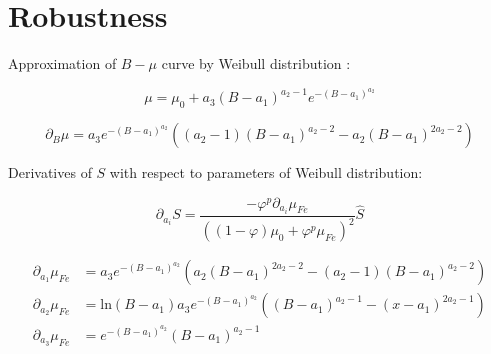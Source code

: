 \newpage
\chapter{Robustness}

\noindent Approximation of $B-\mu$ curve by Weibull distribution :

\begin{equation} \label{eq:70} 
\mu = \mu_0 + a_3 \left( B - a_1 \right)^{a_2 - 1} e^{-\left( B - a_1 \right)^{a_2}}
\end{equation}

\begin{equation} \label{eq:71} 
\partial_B \mu = a_3 e^{-\left( B - a_1 \right)^{a_2}} \left(\left(a_2 -1\right) \left( B - a_1 \right)^{a_2 - 2} - a_2 \left( B - a_1 \right)^{2a_2 - 2} \right) 
\end{equation}

\noindent Derivatives of $S$ with respect to parameters of Weibull distribution:

\begin{equation} \label{eq:72}
\partial_{a_i} S = \frac{-\varphi^p \partial_{a_i}  \mu_{Fe}}{ \left( \left(1 - \varphi\right) \mu_0 + \varphi^p \mu_{Fe}\right)^2} \hat{S}
\end{equation}

\begin{align*} 
\partial_{a_1} \mu_{Fe} &= a_3 e^{-\left(B - a_1\right)^{a_2}} \left( a_2 \left(B - a_1\right)^{2 a_2 - 2} - \left(a_2 - 1\right) \left(B - a_1\right)^{a_2-2}\right) \\
\partial_{a_2} \mu_{Fe} &=  \mathrm{ln}\left(B - a_1\right) a_3 e^{-\left(B - a_1\right)^{a_2}} \left( \left(B - a_1\right)^{a_2 - 1} - \left(x - a_1\right)^{2 a_2 - 1}\right) \\
\partial_{a_3} \mu_{Fe} &= e^{-\left(B - a_1\right)^{a_2}}  \left(B - a_1\right)^{a_2 - 1}
\end{align*}



